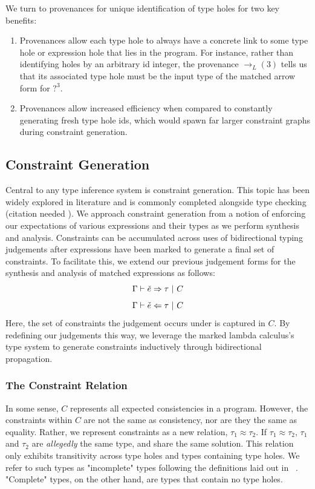 We turn to provenances for unique identification of type holes for two key benefits:
\begin{enumerate}
    \item Provenances allow each type hole to always have a concrete link to some type hole or expression hole that lies in the program. For instance, rather than identifying holes by an arbitrary id integer, the provenance $\rightarrow_L(3)$ tells us that its associated type hole must be the input type of the matched arrow form for $?^3$.
    \item Provenances allow increased efficiency when compared to constantly generating fresh type hole ids, which would spawn far larger constraint graphs during constraint generation.
\end{enumerate}

\subsection{Constraint Generation}
Central to any type inference system is constraint generation. This topic has been widely explored in literature and is commonly completed alongside type checking (citation needed ). We approach constraint generation from a notion of enforcing our expectations of various expressions and their types as we perform synthesis and analysis. Constraints can be accumulated across uses of bidirectional typing judgements after expressions have been marked to generate a final set of constraints. To facilitate this, we extend our previous judgement forms for the synthesis and analysis of matched expressions as follows:
$$\Gamma \vdash \check{e} \Rightarrow \tau ~|~ C$$ 
$$\Gamma \vdash \check{e} \Leftarrow \tau ~|~ C$$
Here, the set of constraints the judgement occurs under is captured in $C$. By redefining our judgements this way, we leverage the marked lambda calculus's type system to generate constraints inductively through bidirectional propagation. 

\subsubsection{The Constraint Relation}
In some sense, $C$ represents all expected consistencies in a program. However, the constraints within $C$ are not the same as consistency, nor are they the same as equality. Rather, we represent constraints as a new relation, $\tau_1 \approx \tau_2$. If $\tau_1 \approx \tau_2$, $\tau_1$ and $\tau_2$ are \textit{allegedly} the same type, and share the same solution. This relation only exhibits transitivity across type holes and types containing type holes. We refer to such types as "incomplete" types following the definitions laid out in ~\cite{HazelnutPOPL}. "Complete" types, on the other hand, are types that contain no type holes. 

